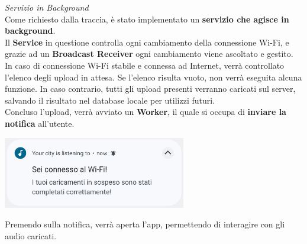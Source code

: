 \documentclass{article}
\begin{document}
\textit{Servizio in Background}\\
Come richiesto dalla traccia, è stato implementato un \textbf{servizio che agisce in background}.\\
Il \textbf{Service} in questione controlla ogni cambiamento della connessione Wi-Fi, e grazie ad un \textbf{Broadcast Receiver} ogni cambiamento viene ascoltato e gestito. In caso di connessione Wi-Fi stabile e connessa ad Internet, verrà controllato l'elenco degli upload in attesa. Se l'elenco risulta vuoto, non verrà eseguita alcuna funzione. In caso contrario, tutti gli upload presenti verranno caricati sul server, salvando il risultato nel database locale per utilizzi futuri.\\
Concluso l'upload, verrà avviato un \textbf{Worker}, il quale si occupa di \textbf{inviare la notifica} all'utente.\\
\begin{center}
    \includegraphics[width=0.6\textwidth]{notifica.png}
\end{center}
Premendo sulla notifica, verrà aperta l'app, permettendo di interagire con gli audio caricati.
\end{document}
